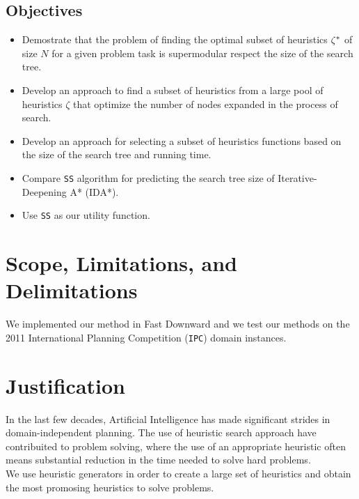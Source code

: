 \subsection{Objectives}
\noindent

\begin{itemize}
  \item Demostrate that the problem of finding the optimal subset of heuristics $\zeta\sp{*}$ of size $N$ for a given problem task is supermodular respect the size of the search tree.
  
  \item Develop an approach to find a subset of heuristics from a large pool of heuristics $\zeta$ that optimize the number of nodes expanded in the process of search.
  
  \item Develop an approach for selecting a subset of heuristics functions based on the size of the search tree and running time.

  \item Compare \texttt{SS} algorithm for predicting the search tree size of Iterative-Deepening A* (IDA*).
  
  \item Use \texttt{SS} as our utility function.

\end{itemize}
\section{Scope, Limitations, and Delimitations}
\noindent
We implemented our method in Fast Downward \cite{helmert2006fast} and we test our methods on the 2011 International Planning Competition (\texttt{IPC}) domain instances.\\

\section{Justification}
\noindent
In the last few decades, Artificial Intelligence has made significant strides in domain-independent planning. The use of heuristic search approach have contribuited to problem solving, where the use of an appropriate heuristic often means substantial reduction in the time needed to solve hard problems.\\

We use heuristic generators in order to create a large set of heuristics and obtain the most promosing heuristics to solve problems.\\

